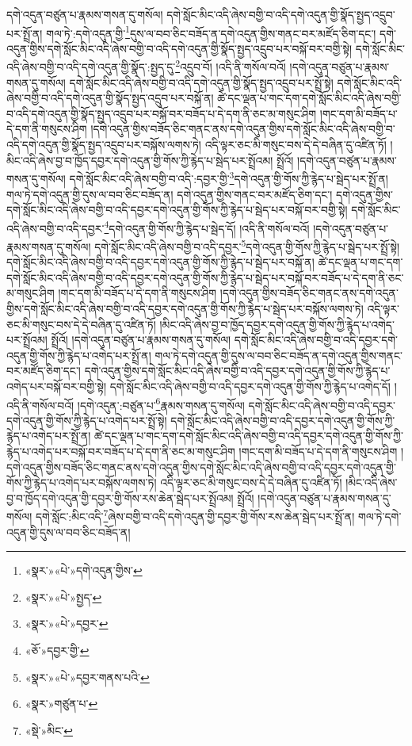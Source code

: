 དགེ་འདུན་བཙུན་པ་རྣམས་གསན་དུ་གསོལ། དགེ་སློང་མིང་འདི་ཞེས་བགྱི་བ་འདི་དགེ་འདུན་གྱི་སྣོད་སྤྱད་འདྲུབ་པར་སྤྲོ་ན། གལ་ཏེ་:དགེ་འདུན་གྱི་\footnote{«སྣར་»«པེ་»དགེ་འདུན་གྱིས་}དུས་ལ་བབ་ཅིང་བཟོད་ན་དགེ་འདུན་གྱིས་གནང་བར་མཛོད་ཅིག་དང་། དགེ་འདུན་གྱིས་དགེ་སློང་མིང་འདི་ཞེས་བགྱི་བ་འདི་དགེ་འདུན་གྱི་སྣོད་སྤྱད་འདྲུབ་པར་བསྐོ་བར་བགྱི་སྟེ། དགེ་སློང་མིང་འདི་ཞེས་བགྱི་བ་འདི་དགེ་འདུན་གྱི་སྣོད་:སྤྱད་དུ་\footnote{«སྣར་»«པེ་»སྤྱད་}འདྲུབ་བོ། །འདི་ནི་གསོལ་བའོ། །དགེ་འདུན་བཙུན་པ་རྣམས་གསན་དུ་གསོལ། དགེ་སློང་མིང་འདི་ཞེས་བགྱི་བ་འདི་དགེ་འདུན་གྱི་སྣོད་སྤྱད་འདྲུབ་པར་སྤྲོ་སྟེ། དགེ་སློང་མིང་འདི་ཞེས་བགྱི་བ་འདི་དགེ་འདུན་གྱི་སྣོད་སྤྱད་འདྲུབ་པར་བསྐོ་ན། ཚེ་དང་ལྡན་པ་གང་དག་དགེ་སློང་མིང་འདི་ཞེས་བགྱི་བ་འདི་དགེ་འདུན་གྱི་སྣོད་སྤྱད་འདྲུབ་པར་བསྐོ་བར་བཟོད་པ་དེ་དག་ནི་ཅང་མ་གསུང་ཤིག །གང་དག་མི་བཟོད་པ་དེ་དག་ནི་གསུངས་ཤིག །དགེ་འདུན་གྱིས་བཟོད་ཅིང་གནང་ནས་དགེ་འདུན་གྱིས་དགེ་སློང་མིང་འདི་ཞེས་བགྱི་བ་འདི་དགེ་འདུན་གྱི་སྣོད་སྤྱད་འདྲུབ་པར་བསྐོས་ལགས་ཏེ། འདི་ལྟར་ཅང་མི་གསུང་བས་དེ་དེ་བཞིན་དུ་འཛིན་ཏོ། །མིང་འདི་ཞེས་བྱ་བ་ཁྱོད་དབྱར་དགེ་འདུན་གྱི་གོས་ཀྱི་རྙེད་པ་སྦེད་པར་སྤྲོའམ། སྤྲོའོ། །དགེ་འདུན་བཙུན་པ་རྣམས་གསན་དུ་གསོལ། དགེ་སློང་མིང་འདི་ཞེས་བགྱི་བ་འདི་:དབྱར་གྱི་\footnote{«སྣར་»«པེ་»དབྱར་}དགེ་འདུན་གྱི་གོས་ཀྱི་རྙེད་པ་སྦེད་པར་སྤྲོ་ན། གལ་ཏེ་དགེ་འདུན་གྱི་དུས་ལ་བབ་ཅིང་བཟོད་ན། དགེ་འདུན་གྱིས་གནང་བར་མཛོད་ཅིག་དང་། དགེ་འདུན་གྱིས་དགེ་སློང་མིང་འདི་ཞེས་བགྱི་བ་འདི་དབྱར་དགེ་འདུན་གྱི་གོས་ཀྱི་རྙེད་པ་སྦེད་པར་བསྐོ་བར་བགྱི་སྟེ། དགེ་སློང་མིང་འདི་ཞེས་བགྱི་བ་འདི་དབྱར་\footnote{«ཅོ་»དབྱར་གྱི་}དགེ་འདུན་གྱི་གོས་ཀྱི་རྙེད་པ་སྦེད་དོ། །འདི་ནི་གསོལ་བའོ། །དགེ་འདུན་བཙུན་པ་རྣམས་གསན་དུ་གསོལ། དགེ་སློང་མིང་འདི་ཞེས་བགྱི་བ་འདི་དབྱར་\footnote{«སྣར་»«པེ་»དབྱར་གནས་པའི་}དགེ་འདུན་གྱི་གོས་ཀྱི་རྙེད་པ་སྦེད་པར་སྤྲོ་སྟེ། དགེ་སློང་མིང་འདི་ཞེས་བགྱི་བ་འདི་དབྱར་དགེ་འདུན་གྱི་གོས་ཀྱི་རྙེད་པ་སྦེད་པར་བསྐོ་ན། ཚེ་དང་ལྡན་པ་གང་དག་དགེ་སློང་མིང་འདི་ཞེས་བགྱི་བ་འདི་དབྱར་དགེ་འདུན་གྱི་གོས་ཀྱི་རྙེད་པ་སྦེད་པར་བསྐོ་བར་བཟོད་པ་དེ་དག་ནི་ཅང་མ་གསུང་ཤིག །གང་དག་མི་བཟོད་པ་དེ་དག་ནི་གསུངས་ཤིག །དགེ་འདུན་གྱིས་བཟོད་ཅིང་གནང་ནས་དགེ་འདུན་གྱིས་དགེ་སློང་མིང་འདི་ཞེས་བགྱི་བ་འདི་དབྱར་དགེ་འདུན་གྱི་གོས་ཀྱི་རྙེད་པ་སྦེད་པར་བསྐོས་ལགས་ཏེ། འདི་ལྟར་ཅང་མི་གསུང་བས་དེ་དེ་བཞིན་དུ་འཛིན་ཏོ། །མིང་འདི་ཞེས་བྱ་བ་ཁྱོད་དབྱར་དགེ་འདུན་གྱི་གོས་ཀྱི་རྙེད་པ་འགེད་པར་སྤྲོའམ། སྤྲོའོ། །དགེ་འདུན་བཙུན་པ་རྣམས་གསན་དུ་གསོལ། དགེ་སློང་མིང་འདི་ཞེས་བགྱི་བ་འདི་དབྱར་དགེ་འདུན་གྱི་གོས་ཀྱི་རྙེད་པ་འགེད་པར་སྤྲོ་ན། གལ་ཏེ་དགེ་འདུན་གྱི་དུས་ལ་བབ་ཅིང་བཟོད་ན་དགེ་འདུན་གྱིས་གནང་བར་མཛོད་ཅིག་དང་། དགེ་འདུན་གྱིས་དགེ་སློང་མིང་འདི་ཞེས་བགྱི་བ་འདི་དབྱར་དགེ་འདུན་གྱི་གོས་ཀྱི་རྙེད་པ་འགེད་པར་བསྐོ་བར་བགྱི་སྟེ། དགེ་སློང་མིང་འདི་ཞེས་བགྱི་བ་འདི་དབྱར་དགེ་འདུན་གྱི་གོས་ཀྱི་རྙེད་པ་འགེད་དོ། །འདི་ནི་གསོལ་བའོ། །དགེ་འདུན་:བཙུན་པ་\footnote{«སྣར་»གཙུན་པ་}རྣམས་གསན་དུ་གསོལ། དགེ་སློང་མིང་འདི་ཞེས་བགྱི་བ་འདི་དབྱར་དགེ་འདུན་གྱི་གོས་ཀྱི་རྙེད་པ་འགེད་པར་སྤྲོ་སྟེ། དགེ་སློང་མིང་འདི་ཞེས་བགྱི་བ་འདི་དབྱར་དགེ་འདུན་གྱི་གོས་ཀྱི་རྙེད་པ་འགེད་པར་སྤྲོ་ན། ཚེ་དང་ལྡན་པ་གང་དག་དགེ་སློང་མིང་འདི་ཞེས་བགྱི་བ་འདི་དབྱར་དགེ་འདུན་གྱི་གོས་ཀྱི་རྙེད་པ་འགེད་པར་བསྐོ་བར་བཟོད་པ་དེ་དག་ནི་ཅང་མ་གསུང་ཤིག །གང་དག་མི་བཟོད་པ་དེ་དག་ནི་གསུངས་ཤིག །དགེ་འདུན་གྱིས་བཟོད་ཅིང་གནང་ནས་དགེ་འདུན་གྱིས་དགེ་སློང་མིང་འདི་ཞེས་བགྱི་བ་འདི་དབྱར་དགེ་འདུན་གྱི་གོས་ཀྱི་རྙེད་པ་འགེད་པར་བསྐོས་ལགས་ཏེ། འདི་ལྟར་ཅང་མི་གསུང་བས་དེ་དེ་བཞིན་དུ་འཛིན་ཏོ། །མིང་འདི་ཞེས་བྱ་བ་ཁྱོད་དགེ་འདུན་གྱི་དབྱར་གྱི་གོས་རས་ཆེན་སྦེད་པར་སྤྲོའམ། སྤྲོའོ། །དགེ་འདུན་བཙུན་པ་རྣམས་གསན་དུ་གསོལ། དགེ་སློང་:མིང་འདི་\footnote{«སྡེ་»མིང་}ཞེས་བགྱི་བ་འདི་དགེ་འདུན་གྱི་དབྱར་གྱི་གོས་རས་ཆེན་སྦེད་པར་སྤྲོ་ན། གལ་ཏེ་དགེ་འདུན་གྱི་དུས་ལ་བབ་ཅིང་བཟོད་ན། 